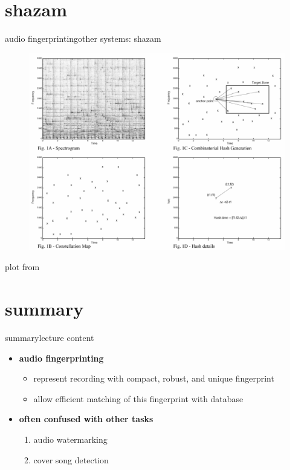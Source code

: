      \section{shazam}   
        \begin{frame}{audio fingerprinting}{other systems: shazam}
            \vspace{-3mm}
            \begin{figure}
                \centering
                \includegraphics[scale=.23]{graph/fingerprint_shazaam}
            \end{figure}
            \vspace{-5mm}
            plot from 
            
        \end{frame}
    
    \section{summary}
        \begin{frame}{summary}{lecture content}
            \begin{itemize}
                \item   \textbf{audio fingerprinting}
                    \begin{itemize}
                        \item   represent recording with compact, robust, and unique fingerprint
                        \item   allow efficient matching of this fingerprint with database
                    \end{itemize}
                \bigskip
                \item   \textbf{often confused with other tasks}
                    \begin{enumerate}
                        \item   audio watermarking
                        \item   cover song detection
                    \end{enumerate}
            \end{itemize}
        \end{frame}

